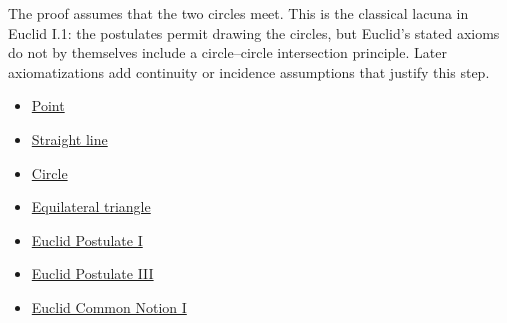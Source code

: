 \begin{remark*}
The proof assumes that the two circles meet. This is the classical lacuna in
Euclid I.1: the postulates permit drawing the circles, but Euclid's stated
axioms do not by themselves include a circle--circle intersection principle.
Later axiomatizations add continuity or incidence assumptions that justify this
step.
\end{remark*}

\begin{dependencies}
\begin{itemize}
  \item \hyperref[def:euclid-point]{Point}
  \item \hyperref[def:euclid-straight-line]{Straight line}
  \item \hyperref[def:euclid-circle]{Circle}
  \item \hyperref[def:euclid-triangle-side-classes]{Equilateral triangle}
  \item \hyperref[ax:euclid-postulate-draw-straight-line]{Euclid Postulate I}
  \item \hyperref[ax:euclid-postulate-describe-circle]{Euclid Postulate III}
  \item \hyperref[ax:euclid-common-notion-things-equal-to-same]{Euclid Common Notion I}
\end{itemize}
\end{dependencies}

\clearpage
